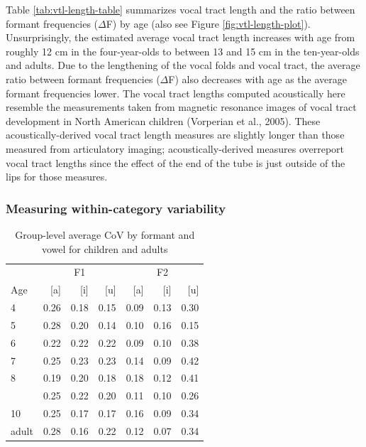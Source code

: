 \documentclass[
]{article}
\begin{document}
Table \ref{tab:vtl-length-table} summarizes vocal tract length and the ratio between formant frequencies (\(\Delta\)F) by age (also see Figure \ref{fig:vtl-length-plot}). Unsurprisingly, the estimated average vocal tract length increases with age from roughly 12 cm in the four-year-olds to between 13 and 15 cm in the ten-year-olds and adults. Due to the lengthening of the vocal folds and vocal tract, the average ratio between formant frequencies (\(\Delta\)F) also decreases with age as the average formant frequencies lower. The vocal tract lengths computed acoustically here resemble the measurements taken from magnetic resonance images of vocal tract development in North American children (Vorperian et al., 2005). These acoustically-derived vocal tract length measures are slightly longer than those measured from articulatory imaging; acoustically-derived measures overreport vocal tract lengths since the effect of the end of the tube is just outside of the lips for those measures.

\hypertarget{measuring-within-category-variability}{%
\subsubsection{Measuring within-category variability}\label{measuring-within-category-variability}}

\begin{table}[!h]

\caption{\label{tab:delta-disp-tbl-group}Group-level average CoV by formant and vowel for children and adults}
\centering
\begin{tabular}[t]{lrrrrrr}
\toprule
\multicolumn{1}{c}{ } & \multicolumn{3}{c}{F1} & \multicolumn{3}{c}{F2} \\
\cmidrule(l{3pt}r{3pt}){2-4} \cmidrule(l{3pt}r{3pt}){5-7}
Age & [a] & [i] & [u] & [a]  & [i]  & [u] \\
\midrule
4 & 0.26 & 0.18 & 0.15 & 0.09 & 0.13 & 0.30\\
5 & 0.28 & 0.20 & 0.14 & 0.10 & 0.16 & 0.15\\
6 & 0.22 & 0.22 & 0.22 & 0.09 & 0.10 & 0.38\\
7 & 0.25 & 0.23 & 0.23 & 0.14 & 0.09 & 0.42\\
8 & 0.19 & 0.20 & 0.18 & 0.18 & 0.12 & 0.41\\
\addlinespace
9 & 0.25 & 0.22 & 0.20 & 0.11 & 0.10 & 0.26\\
10 & 0.25 & 0.17 & 0.17 & 0.16 & 0.09 & 0.34\\
adult & 0.28 & 0.16 & 0.22 & 0.12 & 0.07 & 0.34\\
\bottomrule
\end{tabular}
\end{table}
\end{document}
